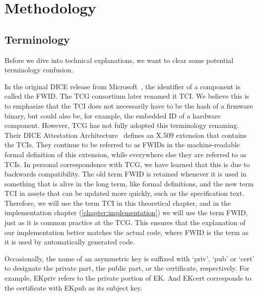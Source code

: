 
\chapter{Methodology}\label{chapter:methodology}

\section{Terminology}\label{sec:terminology}

Before we dive into technical explanations, we want to clear some potential terminology confusion.

In the original DICE release from Microsoft~\cite{England2016}, the identifier of a component is called the \ac{FWID}.
The \ac{TCG} consortium later renamed it \ac{TCI}.
We believe this is to emphasize that the TCI does not necessarily have to be the hash of a firmware binary, but could also be, for example, the embedded ID of a hardware component.
However, \ac{TCG} has not fully adopted this terminology renaming.
Their DICE Attestation Architecture~\cite{TCGAttestation2021} defines an X.509 extension that contains the \acp{TCI}.
They continue to be referred to as \acp{FWID} in the machine-readable formal definition of this extension, while everywhere else they are referred to as \acp{TCI}.
In personal correspondence with \ac{TCG}, we have learned that this is due to backwards compatibility.
The old term \ac{FWID} is retained whenever it is used in something that is alive in the long term, like formal definitions, and the new term \ac{TCI} in assets that can be updated more quickly, such as the specification text.
Therefore, we will use the term \ac{TCI} in this theoretical chapter, and in the implementation chapter (\autoref{chapter:implementation}) we will use the term \ac{FWID}, just as it is common practice at the \ac{TCG}\@.
This ensures that the explanation of our implementation better matches the actual code, where \ac{FWID} is the term as it is used by automatically generated code.

Occasionally, the name of an asymmetric key is suffixed with `priv', `pub' or `cert' to designate the private part, the public part, or the certificate, respectively.
For example, EKpriv refers to the private portion of EK\@.
And EKcert corresponds to the certificate with EKpub as its subject key.



